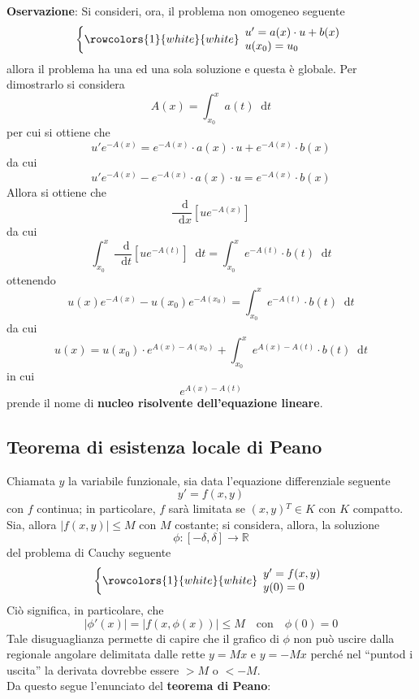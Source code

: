 \documentclass[a4paper]{extarticle}
\newcommand{\quotes}[1]{``#1''}
\newcommand*\dif{\mathop{}\!\mathrm{d}}
\begin{document}
\vspace{2em}
\noindent
\textbf{Oservazione}: Si consideri, ora, il problema non omogeneo seguente
\[\left\{
    \rowcolors{1}{white}{white}
    \begin{array}{lll}
        u'=a(x) \cdot u + b(x)\\
        u(x_0)=u_0\\
    \end{array}
\right.\]
allora il problema ha una ed una sola soluzione e questa è globale. Per dimostrarlo si considera
\[A(x)=\int_{x_0}^x a(t) \dif t\]
per cui si ottiene che
\[u' e^{-A(x)} = e^{-A(x)} \cdot a(x) \cdot u + e^{-A(x)} \cdot b(x)\]
da cui
\[u' e^{-A(x)} - e^{-A(x)} \cdot a(x) \cdot u = e^{-A(x)} \cdot b(x)\]
Allora si ottiene che
\[\dfrac{\dif}{\dif x} \left[u e^{-A(x)}\right]\]
da cui
\[\int_{x_0}^x \dfrac{\dif}{\dif t} \left[u e^{-A(t)}\right] \dif t = \int_{x_0}^x e^{-A(t)} \cdot b(t) \dif t \]
ottenendo
\[u(x) e^{-A(x)} - u(x_0) e^{-A(x_0)} = \int_{x_0}^x e^{-A(t)} \cdot b(t) \dif t\]
da cui
\[\boxed{u(x)=u(x_0) \cdot e^{A(x)-A(x_0)} + \int_{x_0}^x e^{A(x) - A(t)} \cdot b(t) \dif t}\]
in cui
\[e^{A(x) - A(t)}\]
prende il nome di \textbf{nucleo risolvente dell'equazione lineare}.

\vspace{1em}
\subsection{Teorema di esistenza locale di Peano}
Chiamata $y$ la variabile funzionale, sia data l'equazione differenziale seguente
\[y'=f(x,y)\]
con $f$ continua; in particolare, $f$ sarà limitata se $(x,y){^T} \in K$ con $K$ compatto.\\
Sia, allora $\left\vert f(x,y)\right\vert \leq M$ con $M$ costante; si considera, allora, la soluzione
\[\phi : \left[-\delta,\delta\right] \rightarrow \mathbb{R}\]
del problema di Cauchy seguente
\[\left\{
    \rowcolors{1}{white}{white}
    \begin{array}{lll}
        y'=f(x,y)\\
        y(0)=0
    \end{array}
\right.\]
Ciò significa, in particolare, che
\[\left\vert \phi'(x) \right\vert = \left\vert f(x,\phi(x)) \right\vert \leq M \hspace{1em} \text{con} \hspace{1em} \phi(0)=0\]
Tale disuguaglianza permette di capire che il grafico di $\phi$ non può uscire dalla regionale angolare delimitata dalle rette $y=Mx$ e $y=-Mx$ perché nel \quotes{puntod i uscita} la derivata dovrebbe essere $>M$ o $<-M$.\\
Da questo segue l'enunciato del \textbf{teorema di Peano}:
\end{document}
